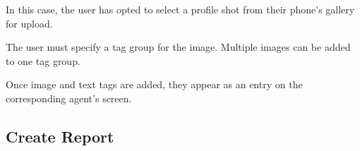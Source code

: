 \begin{minipage}{\textwidth}
  \centering
  \begin{minipage}[t]{4.6cm}
    \vspace{0pt}
    \centering
    \begin{minipage}{4.4cm}
      In this case, the user has opted to select a profile shot from their phone's gallery for upload.
    \end{minipage}
  \end{minipage}
  \begin{minipage}[t]{4.6cm}
    \vspace{0pt}
    \centering
    \begin{minipage}{4.4cm}
      The user must specify a tag group for the image. Multiple images can be added to one tag group.
    \end{minipage}
  \end{minipage}
  \begin{minipage}[t]{4.6cm}
    \vspace{0pt}
    \centering
    \begin{minipage}{4.4cm}
      Once image and text tags are added, they appear as an entry on the corresponding agent's screen.
    \end{minipage}
  \end{minipage}
\end{minipage}

\subsection{Create Report}

